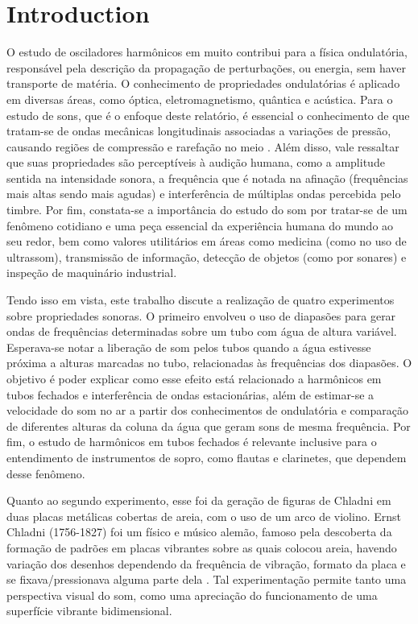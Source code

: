 \section{Introduction}
O estudo de osciladores harmônicos em muito contribui para a física ondulatória, responsável pela descrição da propagação de perturbações, ou energia, sem haver transporte de matéria. O conhecimento de propriedades ondulatórias é aplicado em diversas áreas, como óptica, eletromagnetismo, quântica e acústica. Para o estudo de sons, que é o enfoque deste relatório, é essencial o conhecimento de que tratam-se de ondas mecânicas longitudinais associadas a variações de pressão, causando regiões de compressão e rarefação no meio \cite{Nussenzveig_2014}. Além disso, vale ressaltar que suas propriedades são perceptíveis à audição humana, como a amplitude sentida na intensidade sonora, a frequência que é notada na afinação (frequências mais altas sendo mais agudas) e interferência de múltiplas ondas percebida pelo timbre. Por fim, constata-se a importância do estudo do som por tratar-se de um fenômeno cotidiano e uma peça essencial da experiência humana do mundo ao seu redor, bem como valores utilitários em áreas como medicina (como no uso de ultrassom), transmissão de informação, detecção de objetos (como por sonares) e inspeção de maquinário industrial.

Tendo isso em vista, este trabalho discute a realização de quatro experimentos sobre propriedades sonoras. O primeiro envolveu o uso de diapasões para gerar ondas de frequências determinadas sobre um tubo com água de altura variável. Esperava-se notar a liberação de som pelos tubos quando a água estivesse próxima a alturas marcadas no tubo, relacionadas às frequências dos diapasões. O objetivo é poder explicar como esse efeito está relacionado a harmônicos em tubos fechados e interferência de ondas estacionárias, além de estimar-se a velocidade do som no ar a partir dos conhecimentos de ondulatória e comparação de diferentes alturas da coluna da água que geram sons de mesma frequência. Por fim, o estudo de harmônicos em tubos fechados é relevante inclusive para o entendimento de instrumentos de sopro, como flautas e clarinetes, que dependem desse fenômeno.

Quanto ao segundo experimento, esse foi da geração de figuras de Chladni em duas placas metálicas cobertas de areia, com o uso de um arco de violino. Ernst Chladni (1756-1827) foi um físico e músico alemão, famoso pela descoberta da formação de padrões em placas vibrantes sobre as quais colocou areia, havendo variação dos desenhos dependendo da frequência de vibração, formato da placa e se fixava/pressionava alguma parte dela \cite{santos2017descobertas}. Tal experimentação permite tanto uma perspectiva visual do som, como uma apreciação do funcionamento de uma superfície vibrante bidimensional.

